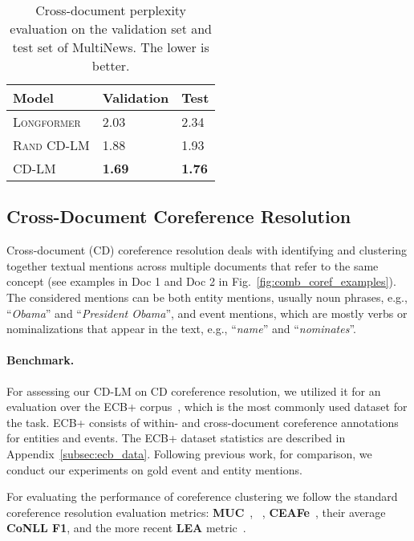 \documentclass[11pt,a4paper]{article}
\begin{document}
\begin{table}[tb!]
\centering
    \small
  \def\arraystretch{1.12}\tabcolsep=6pt    
\begin{tabular}{lll}
                      \toprule
Model               & Validation           & Test     \\ \toprule
\textsc{Longformer} & 2.03 & 2.34\\
\textsc{Rand CD-LM} & 1.88 & 1.93\\
\textsc{CD-LM} & \textbf{1.69} & \textbf{1.76}\\

\bottomrule
\end{tabular}
\caption{Cross-document perplexity evaluation on the validation set and test set of MultiNews. The lower is better.}
\label{tab:ppl}
\vspace{-3mm}
\end{table}
  \subsection{Cross-Document Coreference Resolution}
\label{subsec:fdcdcoref}


Cross-document (CD) coreference resolution deals with identifying and clustering together textual mentions across multiple documents that refer to the same concept (see examples in Doc 1 and Doc 2 in Fig.~\ref{fig:comb_coref_examples}). The considered mentions can be both entity mentions, usually noun phrases, e.g., ``\emph{Obama}'' and ``\emph{President Obama}'', and event mentions, which are mostly verbs or nominalizations that appear in the text, e.g., ``\emph{name}'' and ``\emph{nominates}''. 

\paragraph{Benchmark.} For assessing our CD-LM on CD coreference resolution, we utilized it for an evaluation over the ECB+ corpus~\cite{cybulska2014using}, which is the most commonly used dataset for the task. ECB+ consists of within- and cross-document coreference annotations for entities and events. The ECB+ dataset statistics are described in Appendix~\ref{subsec:ecb_data}. Following previous work, for comparison, we conduct our experiments on gold event and entity mentions.

For evaluating the performance of coreference clustering we follow the standard coreference resolution evaluation metrics: \textbf{MUC}~\cite{vilain1995model}, ~\cite{bagga1998algorithms}, \textbf{CEAFe}~\cite{luo2005coreference}, their average \textbf{CoNLL F1}, and the more recent \textbf{LEA} metric~\cite{moosavi-strube-2016-coreference}.
\end{document}
